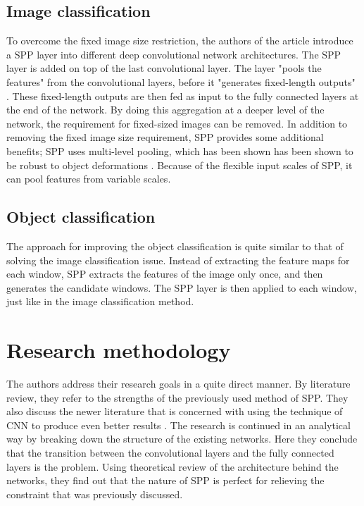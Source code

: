 \subsection{Image classification}
To overcome the fixed image size restriction, the authors of the article introduce a SPP layer into different deep convolutional network architectures. The SPP layer is added on top of the last convolutional layer. The layer "pools the features" \cite{SPPinDCN} from the convolutional layers, before it "generates fixed-length outputs" \cite{SPPinDCN}. These fixed-length outputs are then fed as input to the fully connected layers at the end of the network. By doing this aggregation at a deeper level of the network, the requirement for fixed-sized images can be removed. In addition to removing the fixed image size requirement, SPP provides some additional benefits; SPP uses multi-level pooling, which has been shown has been shown to be robust to object deformations \cite{BBoF}. Because of the flexible input scales of SPP, it can pool features from variable scales.

\subsection{Object classification}
The approach for improving the object classification is quite similar to that of solving the image classification issue. Instead of extracting the feature maps for each window, SPP extracts the features of the image only once, and then generates the candidate windows. The SPP layer is then applied to each window, just like in the image classification method.


\section{Research methodology}
The authors address their research goals in a quite direct manner.  By literature review, they refer to the strengths of the previously used method of SPP. They also discuss the newer literature that is concerned with using the technique of CNN to produce even better results \cite{IMGNET}. The research is continued in an analytical way by breaking down the structure of the existing networks. Here they conclude that the transition between the convolutional layers and the fully connected layers is the problem. Using theoretical review of the architecture behind the networks, they find out that the nature of SPP is perfect for relieving the constraint that was previously discussed. 


